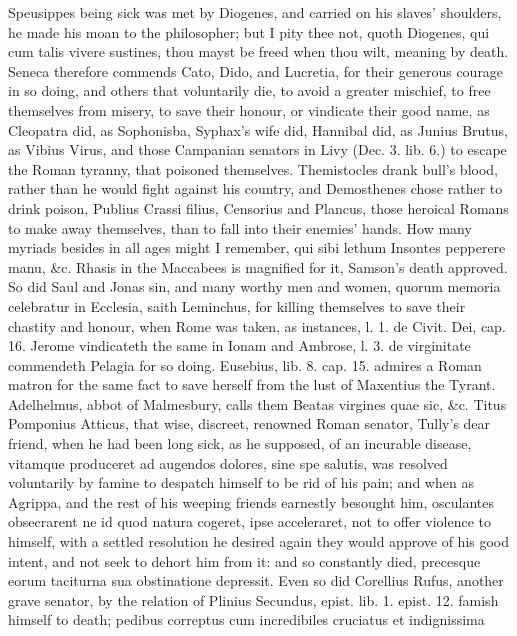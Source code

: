Speusippes being sick was met by Diogenes, and carried on his slaves'
shoulders, he made his moan to the philosopher; but I pity thee not,
quoth Diogenes, qui cum talis vivere sustines, thou mayst be freed when
thou wilt, meaning by death. Seneca therefore commends Cato,
Dido, and Lucretia, for their generous courage in so doing, and others
that voluntarily die, to avoid a greater mischief, to free themselves
from misery, to save their honour, or vindicate their good name, as
Cleopatra did, as Sophonisba, Syphax's wife did, Hannibal did, as
Junius Brutus, as Vibius Virus, and those Campanian senators in Livy
(Dec. 3. lib. 6.) to escape the Roman tyranny, that poisoned
themselves. Themistocles drank bull's blood, rather than he would fight
against his country, and Demosthenes chose rather to drink poison,
Publius Crassi filius, Censorius and Plancus, those heroical Romans to
make away themselves, than to fall into their enemies' hands. How many
myriads besides in all ages might I remember, qui sibi lethum Insontes
pepperere manu, \&c. Rhasis in the Maccabees is magnified for it,
Samson's death approved. So did Saul and Jonas sin, and many worthy men
and women, quorum memoria celebratur in Ecclesia, saith
Leminchus, for killing themselves to save their chastity and
honour, when Rome was taken, as \Austin instances, l. 1. de Civit. Dei,
cap. 16. Jerome vindicateth the same in Ionam and Ambrose, l. 3. de
virginitate commendeth Pelagia for so doing. Eusebius, lib. 8. cap. 15.
admires a Roman matron for the same fact to save herself from the lust
of Maxentius the Tyrant. Adelhelmus, abbot of Malmesbury, calls them
Beatas virgines quae sic, \&c. Titus Pomponius Atticus, that wise,
discreet, renowned Roman senator, Tully's dear friend, when he had been
long sick, as he supposed, of an incurable disease, vitamque produceret
ad augendos dolores, sine spe salutis, was resolved voluntarily by
famine to despatch himself to be rid of his pain; and when as Agrippa,
and the rest of his weeping friends earnestly besought him, osculantes
obsecrarent ne id quod natura cogeret, ipse acceleraret, not to offer
violence to himself, with a settled resolution he desired again they
would approve of his good intent, and not seek to dehort him from it:
and so constantly died, precesque eorum taciturna sua obstinatione
depressit. Even so did Corellius Rufus, another grave senator, by the
relation of Plinius Secundus, epist. lib. 1. epist. 12. famish himself
to death; pedibus correptus cum incredibiles cruciatus et indignissima
